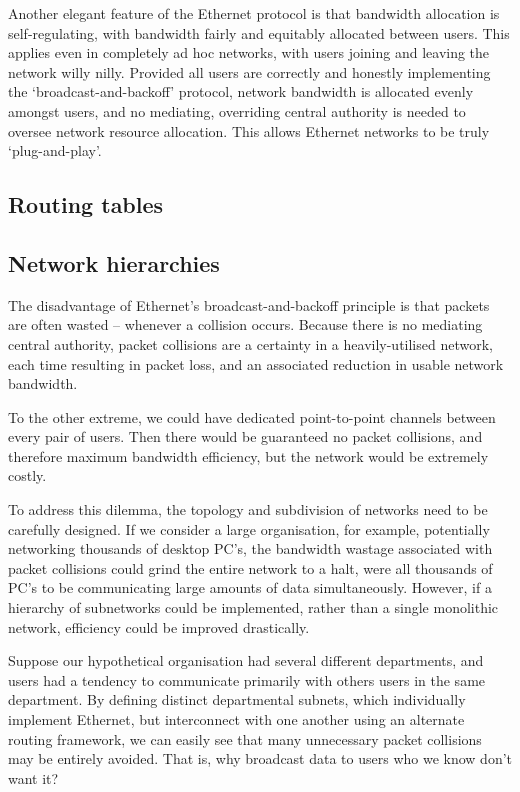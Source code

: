 \documentclass[aps,rmp,twocolumn,amsmath,amssymb,nofootinbib,superscriptaddress,longbibliography,floatfix]{revtex4-1}
\newcommand{\comment}[1]{{\color{blue}{\textbf{#1}}}}
\begin{document}
Another elegant feature of the Ethernet protocol is that bandwidth allocation is self-regulating, with bandwidth fairly and equitably allocated between users. This applies even in completely ad hoc networks, with users joining and leaving the network willy nilly. Provided all users are correctly and honestly implementing the `broadcast-and-backoff' protocol, network bandwidth is allocated evenly amongst users, and no mediating, overriding central authority is needed to oversee network resource allocation. This allows Ethernet networks to be truly `plug-and-play'.

%
%

\subsection{Routing tables}

\comment{To do}

%
%

\subsection{Network hierarchies}

The disadvantage of Ethernet's broadcast-and-backoff principle is that packets are often wasted -- whenever a collision occurs. Because there is no mediating central authority, packet collisions are a certainty in a heavily-utilised network, each time resulting in packet loss, and an associated reduction in usable network bandwidth.

To the other extreme, we could have dedicated point-to-point channels between every pair of users. Then there would be guaranteed no packet collisions, and therefore maximum bandwidth efficiency, but the network would be extremely costly.

To address this dilemma, the topology and subdivision of networks need to be carefully designed. If we consider a large organisation, for example, potentially networking thousands of desktop PC's, the bandwidth wastage associated with packet collisions could grind the entire network to a halt, were all thousands of PC's to be communicating large amounts of data simultaneously. However, if a hierarchy of subnetworks could be implemented, rather than a single monolithic network, efficiency could be improved drastically.

Suppose our hypothetical organisation had several different departments, and users had a tendency to communicate primarily with others users in the same department. By defining distinct departmental subnets, which individually implement Ethernet, but interconnect with one another using an alternate routing framework, we can easily see that many unnecessary packet collisions may be entirely avoided. That is, why broadcast data to users who we know don't want it?
\end{document}
